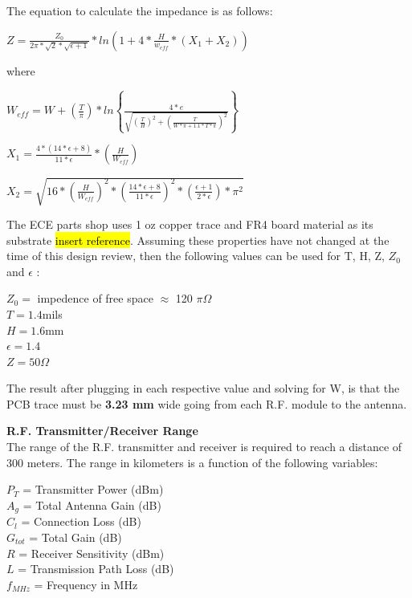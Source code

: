 \documentclass[letterpaper,10pt]{article}
\begin{document}
\begin{spacing}{1.15}
The equation to calculate the impedance is as follows:
\begin{center}
\large$Z = \frac{Z_0}{2\pi*\sqrt{2}*\sqrt{\epsilon+ 1}} * ln\left(1 + 4*\frac{H}{w_{eff}} * \left(X_1 + X_2 \right )\right )$
\end{center}
where
\begin{center}
	\large $W_{eff} = W + \left(\frac{T}{\pi}\right)*ln\left \{\frac{4*e}{\sqrt{\left(\frac{T}{H}\right)^2 + \left (\frac{T}{W*\pi + 1.1*T*\pi }  \right )^{2}}} \right \}$
	
	\vspace{2.5mm}
	
	$X_1 = \frac{4*\left( 14*\epsilon +8\right)}{11*\epsilon} * \left(\frac{H}{W_{eff}} \right)$
	
	\vspace{2.5mm}
	
	$X_2 = \sqrt{16*\left(\frac{H}{W_{eff}} \right )^2 * \left(\frac{14*\epsilon+8}{11*\epsilon} \right )^2 * \left(\frac{\epsilon + 1}{2*\epsilon} \right ) * \pi^2}$
\end{center}

The ECE parts shop uses 1 oz copper trace and FR4 board material as its substrate \hl{insert reference}. Assuming these properties have not changed at the time of this design review, then the following values can be used for T, H, Z, $Z_0$ and $\epsilon$ :
\begin{center}
	$Z_0 =$ impedence of free space $\approx$ 120 $\pi \Omega$ \\
	$T = 1.4 $mils\\
	$H =1.6 $mm\\
	$\epsilon = 1.4$ \\
	$Z = 50 \Omega$
\end{center}
The result after plugging in each respective value and solving for W, is that the PCB trace must be \textbf{3.23 mm} wide going from each R.F. module to the antenna.


\normalsize\textbf{R.F. Transmitter/Receiver Range} \\
The range of the R.F. transmitter and receiver is required to reach a distance of 300 meters. The range in kilometers is a function of the following variables:
\begin{center}
$P_T$ = Transmitter Power (dBm) \\
$A_g$ = Total Antenna Gain (dB) \\
$C_l$ = Connection Loss (dB) \\ 
$G_{tot}$ = Total Gain (dB) \\
$R$ = Receiver Sensitivity (dBm) \\
$L$ = Transmission Path Loss (dB) \\
$f_{MHz}$ = Frequency in MHz \\
\end{center}


\end{spacing}
\end{document}

